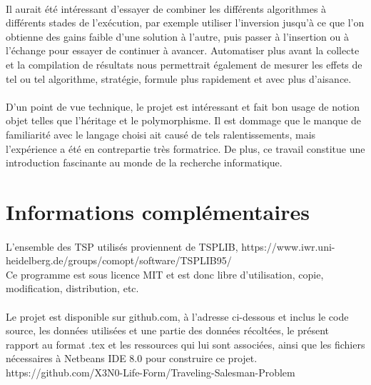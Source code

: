 \documentclass[a4paper,10pt]{report}
\begin{document}
\paragraph{} %
Il aurait été intéressant d'essayer de combiner les différents algorithmes à
différents stades de l'exécution, par exemple utiliser l'inversion jusqu'à ce
que l'on obtienne des gains faible d'une solution à l'autre, puis passer à
l'insertion ou à l'échange pour essayer de continuer à avancer. Automatiser plus
avant la collecte et la compilation de résultats nous permettrait également de
mesurer les effets de tel ou tel algorithme, stratégie, formule plus rapidement
et avec plus d'aisance.

\paragraph{} %
D'un point de vue technique, le projet est intéressant et fait bon usage de
notion objet telles que l'héritage et le polymorphisme. Il est dommage que
le manque de familiarité avec le langage choisi ait causé de tels
ralentissements, mais l'expérience a été en contrepartie très formatrice. De
plus, ce travail constitue une introduction fascinante au monde de la recherche
informatique.


\section*{Informations complémentaires}

\paragraph{}
L'ensemble des TSP utilisés proviennent de TSPLIB,
https://www.iwr.uni-heidelberg.de/groups/comopt/software/TSPLIB95/\\
Ce programme est sous licence MIT et est donc libre d'utilisation, copie,
modification, distribution, etc.

\paragraph{}
Le projet est disponible sur github.com, à l'adresse ci-dessous et inclus le
code source, les données utilisées et une partie des données récoltées,
le présent rapport au format .tex et les ressources qui lui sont associées,
ainsi que les fichiers nécessaires à Netbeans IDE 8.0 pour construire ce
projet.\\
https://github.com/X3N0-Life-Form/Traveling-Salesman-Problem
\end{document}

